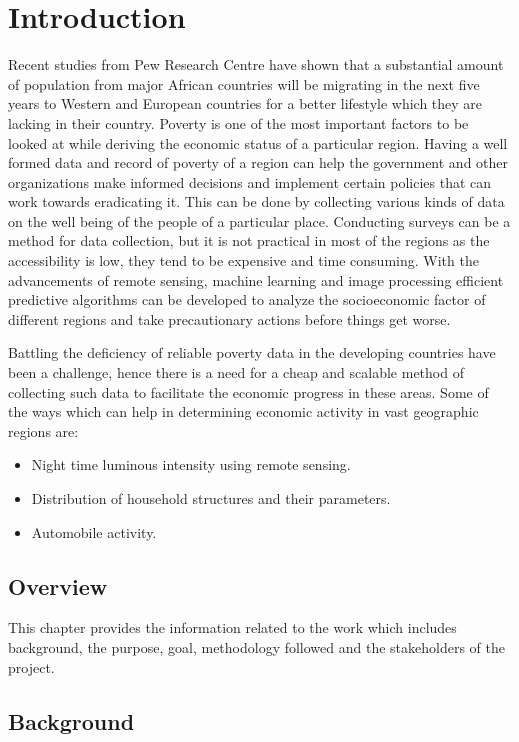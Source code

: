 \chapter{Introduction}
Recent studies from Pew Research Centre have shown that a substantial amount of population from major African countries will be migrating in the next five years to Western and European countries for a better lifestyle which they are lacking in their country. Poverty is one of the most important factors to be looked at while deriving the economic status of a particular region\cite{jean2016combining}. Having a well formed data and record of poverty of a region can help the government and other organizations make informed decisions and implement certain policies that can work towards eradicating it. This can be done by collecting various kinds of data on the well being of the people of a particular place. Conducting surveys can be a method for data collection, but it is not practical in most of the regions as the accessibility is low, they tend to be expensive and time consuming. With the advancements of remote sensing, machine learning and image processing efficient predictive algorithms can be developed to analyze the socioeconomic factor of different regions and take precautionary actions before things get worse.

Battling the deficiency of reliable poverty data in the developing countries have been a challenge, hence there is a need for a cheap and scalable method of collecting such data to facilitate the economic progress in these areas. Some of the ways which can help in determining economic activity in vast geographic regions are:
\begin{itemize}
    

\item Night time luminous intensity using remote sensing.
\item Distribution of household structures and their parameters.
\item Automobile activity.
\end{itemize}

\section{Overview}
This chapter provides the information related to the work which includes background, the purpose, goal, methodology followed and the stakeholders of the project.

\section{Background}
\label{sec:background}


